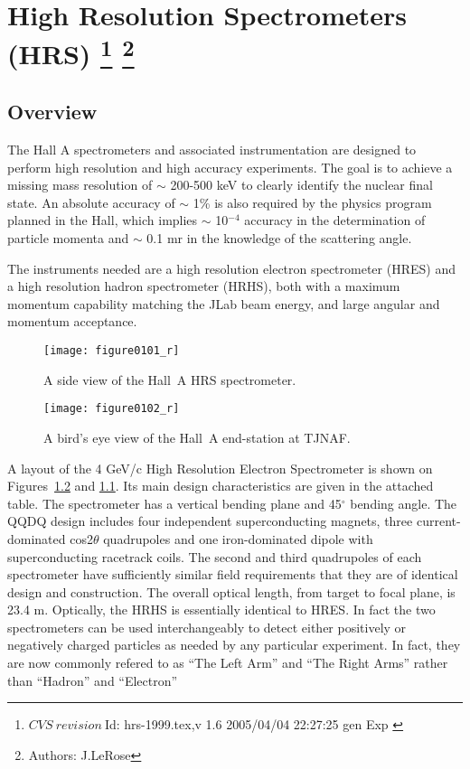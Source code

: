 \chapter[High Resolution Spectrometers (HRS)]{High Resolution Spectrometers (HRS)
\footnote{
  $CVS~revision~ $Id: hrs-1999.tex,v 1.6 2005/04/04 22:27:25 gen Exp $ $ 
}
\footnote{Authors: J.LeRose }
}
\label{chap:hrs}
\section{Overview}
   
The Hall A spectrometers and associated instrumentation are designed to 
perform high resolution and high accuracy experiments.  The goal is to 
achieve a missing mass resolution of $\sim$ 200-500 keV to clearly 
identify the nuclear final state.  An absolute accuracy of $\sim$ 1\% is 
also required by the physics program planned in the Hall, which implies 
$\sim$ 10$^{-4}$ accuracy in the determination of particle momenta and 
$\sim$ 0.1 mr in the knowledge of the scattering angle.

The instruments needed are a high resolution electron spectrometer 
(HRES) and a high resolution hadron spectrometer (HRHS), both with a 
maximum momentum capability matching the JLab beam energy, and large 
angular and momentum acceptance.

\begin{figure}[tbp]
\begin{center}
\texttt{[image: figure0101\_r]}
\caption[Spectrometers: Elevation View of Hall~A HRS]{A side view of the Hall~A
HRS spectrometer.}  
\label{fig:hrs_ev}
\end{center}
\end{figure}
 
\begin{figure}[tbp]
\begin{center}
\texttt{[image: figure0102\_r]}
\caption[Spectrometers: Plan View of Hall~A]{A bird's eye view of the Hall~A
end-station at TJNAF.}  
\label{fig:hrs_pv}
\end{center}
\end{figure}


A layout of the 4 GeV/c High Resolution Electron Spectrometer is shown 
on Figures~\ref{fig:hrs_pv} and \ref{fig:hrs_ev}.
Its main design characteristics are 
given in the attached table.  The spectrometer has a vertical bending 
plane and 45$^{\circ}$ bending angle.  The QQDQ design includes four 
independent superconducting magnets, three current-dominated 
cos2$\theta $ quadrupoles and one iron-dominated dipole with 
superconducting racetrack coils.  The second and third quadrupoles of 
each spectrometer have sufficiently similar field requirements that they 
are of identical design and construction.  The overall optical length, 
from target to focal plane, is 23.4 m.  Optically, the HRHS 
is essentially identical to HRES. In fact the two spectrometers can be used 
interchangeably to detect either positively or negatively charged particles 
as needed by any particular experiment. In fact, they are now commonly refered to 
as ``The Left Arm'' and ``The Right Arms'' rather than ``Hadron'' and ``Electron'' 

